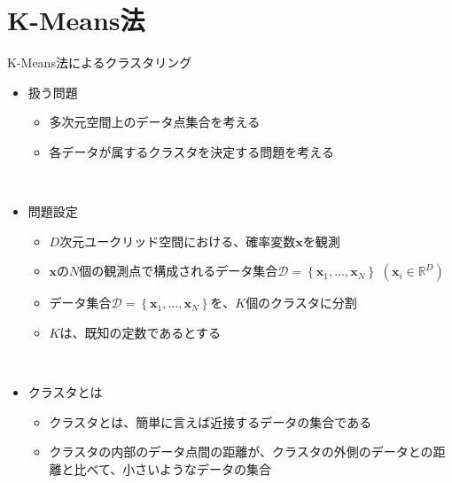 \documentclass[dvipdfmx,notheorems,t]{beamer}
\begin{document}
\section{K-Means法}

\begin{frame}{K-Means法によるクラスタリング}

\begin{itemize}
	\item 扱う問題
	\begin{itemize}
		\item 多次元空間上のデータ点集合を考える
		\item \alert{各データが属するクラスタを決定}する問題を考える
	\end{itemize} \
	
	\item 問題設定
	\begin{itemize}
		\item $D$次元ユークリッド空間における、確率変数$\bm{x}$を観測
		\item $\bm{x}$の$N$個の観測点で構成されるデータ集合$\mathcal{D} = \left\{ \bm{x}_1, \ldots, \bm{x}_N \right\}$ $(\bm{x}_i \in \mathbb{R}^D)$
		\item データ集合$\mathcal{D} = \left\{ \bm{x}_1, \ldots, \bm{x}_N \right\}$を、$K$個のクラスタに分割
		\item $K$は、\alert{既知の定数}であるとする
	\end{itemize} \
	
	\item クラスタとは
	\begin{itemize}
		\item クラスタとは、簡単に言えば\alert{近接するデータの集合}である
		\item クラスタの内部のデータ点間の距離が、クラスタの外側のデータとの距離と比べて、小さいようなデータの集合
	\end{itemize}
\end{itemize}

\end{frame}
\end{document}
